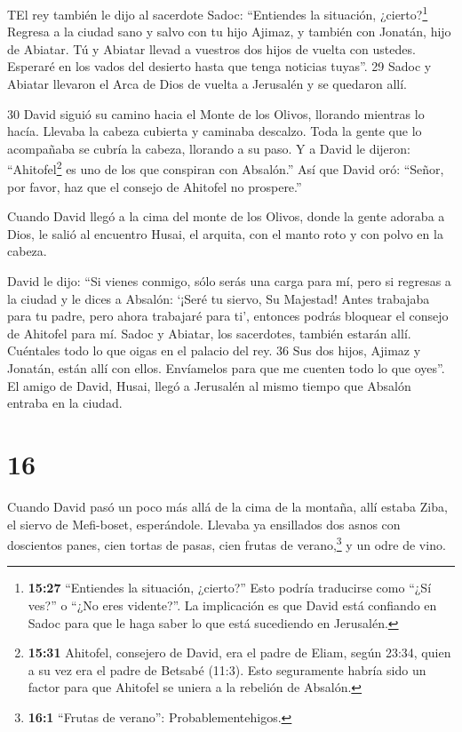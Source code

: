  TEl rey también le dijo al sacerdote Sadoc: ``Entiendes la
situación, ¿cierto?\footnote{\textbf{15:27} ``Entiendes la situación,
  ¿cierto?'' Esto podría traducirse como ``¿Sí ves?'' o ``¿No eres
  vidente?''. La implicación es que David está confiando en Sadoc para
  que le haga saber lo que está sucediendo en Jerusalén.} Regresa a la
ciudad sano y salvo con tu hijo Ajimaz, y también con Jonatán, hijo de
Abiatar. Tú y Abiatar llevad a vuestros dos hijos de vuelta con ustedes.
 Esperaré en los vados del desierto hasta que tenga
noticias tuyas''. 29 Sadoc y Abiatar llevaron el Arca de Dios de vuelta
a Jerusalén y se quedaron allí.

30 David siguió su camino hacia el Monte de los Olivos, llorando
mientras lo hacía. Llevaba la cabeza cubierta y caminaba descalzo. Toda
la gente que lo acompañaba se cubría la cabeza, llorando a su paso.
 Y a David le dijeron: ``Ahitofel\footnote{\textbf{15:31}
  Ahitofel, consejero de David, era el padre de Eliam, según 23:34,
  quien a su vez era el padre de Betsabé (11:3). Esto seguramente habría
  sido un factor para que Ahitofel se uniera a la rebelión de Absalón.}
es uno de los que conspiran con Absalón.'' Así que David oró: ``Señor,
por favor, haz que el consejo de Ahitofel no prospere.''

 Cuando David llegó a la cima del monte de los Olivos,
donde la gente adoraba a Dios, le salió al encuentro Husai, el arquita,
con el manto roto y con polvo en la cabeza.

 David le dijo: ``Si vienes conmigo, sólo serás una carga
para mí,  pero si regresas a la ciudad y le dices a
Absalón: `¡Seré tu siervo, Su Majestad! Antes trabajaba para tu padre,
pero ahora trabajaré para ti', entonces podrás bloquear el consejo de
Ahitofel para mí.  Sadoc y Abiatar, los sacerdotes, también
estarán allí. Cuéntales todo lo que oigas en el palacio del rey. 36 Sus
dos hijos, Ajimaz y Jonatán, están allí con ellos. Envíamelos para que
me cuenten todo lo que oyes''.  El amigo de David, Husai,
llegó a Jerusalén al mismo tiempo que Absalón entraba en la ciudad.

\hypertarget{section-15}{%
\section{16}\label{section-15}}

 Cuando David pasó un poco más allá de la cima de la
montaña, allí estaba Ziba, el siervo de Mefi-boset, esperándole. Llevaba
ya ensillados dos asnos con doscientos panes, cien tortas de pasas, cien
frutas de verano,\footnote{\textbf{16:1} ``Frutas de verano'':
  Probablementehigos.} y un odre de vino.

